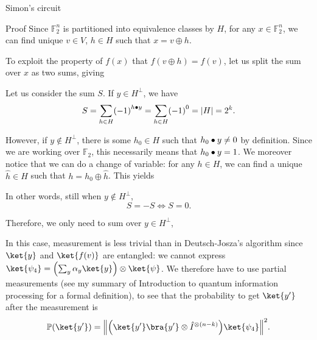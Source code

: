\documentclass[a4paper]{article}
\begin{document}
\begin{parag}{Simon's circuit}
\begin{subparag}{Proof}
        Since $\mathbb{F}_2^n$ is partitioned into equivalence classes by $H$, for any $x \in \mathbb{F}_2^n$, we can find unique $v \in V$, $h \in H$ such that $x = v \oplus h$.

        To exploit the property of $f\left(x\right)$ that $f\left(v \oplus h\right) = f\left(v\right)$, let us split the sum over $x$ as two sums, giving 
        
        Let us consider the sum $S$. If $y \in H^{\perp}$, we have 
        \[S = \sum_{h \in H} \left(-1\right)^{h \dotprod y} = \sum_{h \in H} \left(-1\right)^{0} = \left|H\right| = 2^k.\]

        However, if $y \not \in H^{\perp}$, there is some $h_0 \in H$ such that $h_0 \bullet y \neq 0$ by definition. Since we are working over $\mathbb{F}_2$, this necessarily means that $h_0 \bullet y = 1$. We moreover notice that we can do a change of variable: for any $h \in H$, we can find a unique $\hat{h} \in H$ such that $h = h_0 \oplus \hat{h}$. This yields

        In other words, still when $y \not \in H^{\perp}$,
        \[S = -S \iff S = 0.\]
        
        Therefore, we only need to sum over $y \in H^{\perp}$,

        In this case, measurement is less trivial than in Deutsch-Josza's algorithm since $\ket{y}$ and $\ket{f\left(v\right)}$ are entangled: we cannot express $\ket{\psi_4} = \left(\sum_{y} \alpha_y \ket{y}\right) \otimes \ket{\psi}$. We therefore have to use partial measurements (see my summary of Introduction to quantum information processing for a formal definition), to see that the probability to get $\ket{y'}$ after the measurement is
        \[\prob\left(\ket{y'}\right) = \left\|\left(\ket{y'}\bra{y'} \otimes \hat{I}^{\otimes \left(n-k\right)}\right) \ket{\psi_4}\right\|^2.\]


\end{subparag}
\end{parag}
\end{document}

